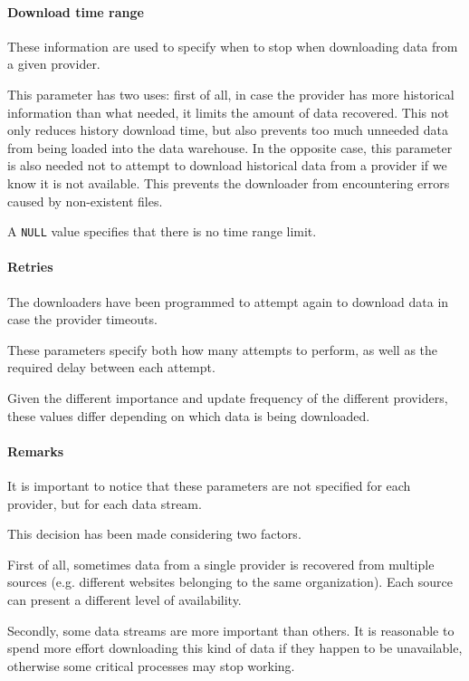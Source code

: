     \paragraph{Download time range}
        These information are used to specify when to stop when downloading data from a given provider.
        
        This parameter has two uses: first of all, in case the provider has more historical information than what needed, it limits the amount of data recovered.
        This not only reduces history download time, but also prevents too much unneeded data from being loaded into the data warehouse.
        In the opposite case, this parameter is also needed not to attempt to download historical data from a provider if we know it is not available.
        This prevents the downloader from encountering errors caused by non-existent files.
        
        A \texttt{NULL} value specifies that there is no time range limit.
    
    \paragraph{Retries}
        The downloaders have been programmed to attempt again to download data in case the provider timeouts.
        
        These parameters specify both how many attempts to perform, as well as the required delay between each attempt.
        
        Given the different importance and update frequency of the different providers, these values differ depending on which data is being downloaded.
    
    \paragraph{Remarks}
        It is important to notice that these parameters are not specified for each provider, but for each data stream.
        
        This decision has been made considering two factors.
        
        First of all, sometimes data from a single provider is recovered from multiple sources (e.g. different websites belonging to the same organization).
        Each source can present a different level of availability.
        
        Secondly, some data streams are more important than others.
        It is reasonable to spend more effort downloading this kind of data if they happen to be unavailable, otherwise some critical processes may stop working.

